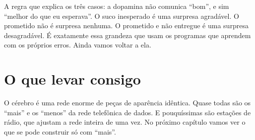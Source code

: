 A regra que explica os três casos: a dopamina não comunica ``bom'', e sim ``melhor do que eu esperava''. O suco inesperado é uma surpresa agradável. O prometido não é surpresa nenhuma. O prometido e não entregue é uma surpresa desagradável. É exatamente essa grandeza que usam os programas que aprendem com os próprios erros. Ainda vamos voltar a ela.

\section*{O que levar consigo}

O cérebro é uma rede enorme de peças de aparência idêntica. Quase todas são os ``mais'' e os ``menos'' da rede telefônica de dados. E pouquíssimas são estações de rádio, que ajustam a rede inteira de uma vez. No próximo capítulo vamos ver o que se pode construir só com ``mais''.

